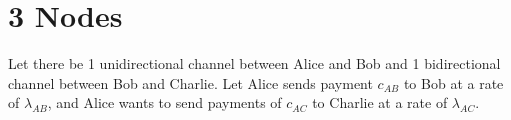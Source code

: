 \documentclass[12pt]{article}
\newtheorem{defi}[theorem]{Definition}
\theoremstyle{plain}
\newtheorem{assumption}{Assumption}
\theoremstyle{remark}
\theoremstyle{definition}
\begin{document}
\section{3 Nodes }
Let there be 1 unidirectional channel between Alice and Bob and 1 bidirectional channel between Bob and Charlie. Let Alice sends payment $c_{AB}$ to Bob at a rate of $\lambda_{AB}$, and Alice wants to send payments of $c_{AC}$ to Charlie at a rate of $\lambda_{AC}$. \\

\end{document}
